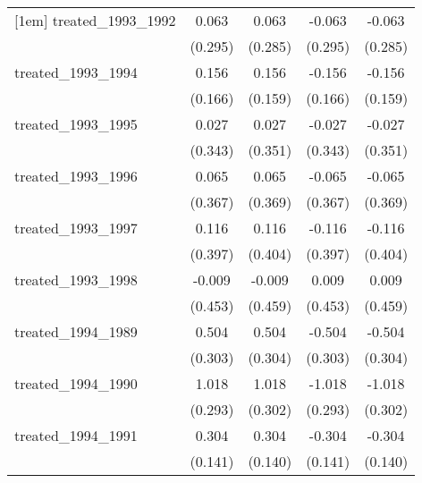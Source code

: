 {\begin{tabular}{l*{4}{c}}
[1em]
treated\_1993\_1992&       0.063         &       0.063         &      -0.063         &      -0.063         \\
            &     (0.295)         &     (0.285)         &     (0.295)         &     (0.285)         \\
[1em]
treated\_1993\_1994&       0.156         &       0.156         &      -0.156         &      -0.156         \\
            &     (0.166)         &     (0.159)         &     (0.166)         &     (0.159)         \\
[1em]
treated\_1993\_1995&       0.027         &       0.027         &      -0.027         &      -0.027         \\
            &     (0.343)         &     (0.351)         &     (0.343)         &     (0.351)         \\
[1em]
treated\_1993\_1996&       0.065         &       0.065         &      -0.065         &      -0.065         \\
            &     (0.367)         &     (0.369)         &     (0.367)         &     (0.369)         \\
[1em]
treated\_1993\_1997&       0.116         &       0.116         &      -0.116         &      -0.116         \\
            &     (0.397)         &     (0.404)         &     (0.397)         &     (0.404)         \\
[1em]
treated\_1993\_1998&      -0.009         &      -0.009         &       0.009         &       0.009         \\
            &     (0.453)         &     (0.459)         &     (0.453)         &     (0.459)         \\
[1em]
treated\_1994\_1989&       0.504         &       0.504         &      -0.504         &      -0.504         \\
            &     (0.303)         &     (0.304)         &     (0.303)         &     (0.304)         \\
[1em]
treated\_1994\_1990&       1.018\sym{***}&       1.018\sym{***}&      -1.018\sym{***}&      -1.018\sym{***}\\
            &     (0.293)         &     (0.302)         &     (0.293)         &     (0.302)         \\
[1em]
treated\_1994\_1991&       0.304\sym{*}  &       0.304\sym{*}  &      -0.304\sym{*}  &      -0.304\sym{*}  \\
            &     (0.141)         &     (0.140)         &     (0.141)         &     (0.140)         \\

\end{tabular}}
